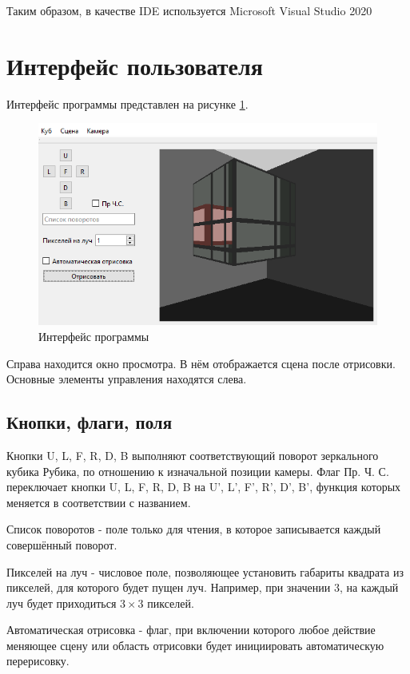 \documentclass[a4paper, 14pt]{report} %
\begin{document}
	Таким образом, в качестве IDE используется Microsoft Visual Studio 2020
	
	\section{Интерфейс пользователя}
	Интерфейс программы представлен на рисунке \ref{fig:interface}.
	
	\begin{figure}[ht]
		\centering
		\includegraphics[width=1\linewidth]{interface}
		\caption{Интерфейс программы}
		\label{fig:interface}
	\end{figure}

	Справа находится окно просмотра. В нём отображается сцена после отрисовки. Основные элементы управления находятся слева.
	
	\subsection{Кнопки, флаги, поля}
	Кнопки U, L, F, R, D, B выполняют соответствующий поворот зеркального кубика Рубика, по отношению к изначальной позиции камеры. Флаг Пр. Ч. С. переключает кнопки U, L, F, R, D, B на U', L', F', R', D', B', функция которых меняется в соответствии с названием.
	
	Список поворотов - поле только для чтения, в которое записывается каждый совершённый поворот.
	
	Пикселей на луч - числовое поле, позволяющее установить габариты квадрата из пикселей, для которого будет пущен луч. Например, при значении 3, на каждый луч будет приходиться $3\times 3$ пикселей.
	
	Автоматическая отрисовка - флаг, при включении которого любое действие меняющее сцену или область отрисовки будет инициировать автоматическую перерисовку.
	
\end{document}
